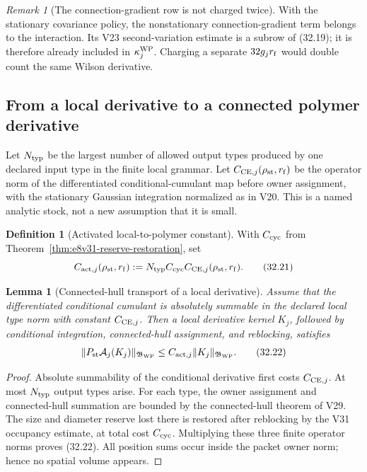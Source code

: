 \documentclass[11pt,oneside]{book}
\newtheorem{lemma}[theorem]{Lemma}
\theoremstyle{definition}
\newtheorem{definition}[theorem]{Definition}
\theoremstyle{remark}
\newtheorem{remark}[theorem]{Remark}
\begin{document}
\begin{remark}[The connection-gradient row is not charged twice]
\label{rem:e8v32-no-double-charge}
With the stationary covariance policy, the nonstationary
connection-gradient term belongs to the interaction.  Its V23
second-variation estimate is a subrow of (32.19); it is therefore
already included in \(\kappa_j^{\rm WP}\).  Charging a separate
\(32g_jr_{\rm f}\) would double count the same Wilson derivative.
\end{remark}

\subsection{From a local derivative to a connected polymer derivative}

Let \(N_{\rm typ}\) be the largest number of allowed output types
produced by one declared input type in the finite local grammar.
Let \(C_{{\rm CE},j}(\rho_{\rm st},r_{\rm f})\) be the operator norm
of the differentiated conditional-cumulant map before owner
assignment, with the stationary Gaussian integration normalized as
in V20.  This is a named analytic stock, not a new assumption that it
is small.

\begin{definition}[Activated local-to-polymer constant]
\label{def:e8v32-activation}
With \(C_{\rm cyc}\) from
Theorem~\ref{thm:e8v31-reserve-restoration}, set
\[
 C_{{\rm act},j}(\rho_{\rm st},r_{\rm f})
 :=
 N_{\rm typ}C_{\rm cyc}
 C_{{\rm CE},j}(\rho_{\rm st},r_{\rm f}).                        \tag{32.21}
\]
\end{definition}

\begin{lemma}[Connected-hull transport of a local derivative]
\label{lem:e8v32-hull-transport}
Assume that the differentiated conditional cumulant is absolutely
summable in the declared local type norm with constant
\(C_{{\rm CE},j}\).  Then a local derivative kernel \(K_j\), followed
by conditional integration, connected-hull assignment, and reblocking,
satisfies
\[
 \|P_{\rm st}{\cal A}_j(K_j)\|_{\mathfrak B_{\rm WP}}
 \leq
 C_{{\rm act},j}\|K_j\|_{\mathfrak B_{\rm WP}}.                  \tag{32.22}
\]
\end{lemma}

\begin{proof}
Absolute summability of the conditional derivative first costs
\(C_{{\rm CE},j}\).  At most \(N_{\rm typ}\) output types arise.
For each type, the owner assignment and connected-hull summation are
bounded by the connected-hull theorem of V29.  The size and diameter
reserve lost there is restored after reblocking by the V31 occupancy
estimate, at total cost \(C_{\rm cyc}\).  Multiplying these three
finite operator norms proves (32.22).  All position sums occur inside
the packet owner norm; hence no spatial volume appears.
\end{proof}
\end{document}
